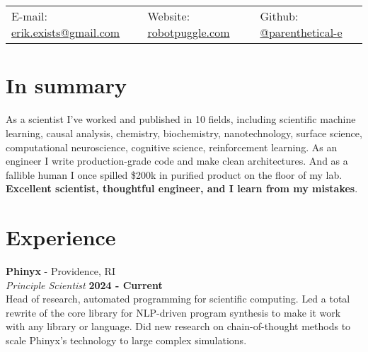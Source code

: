 \documentclass[margin,line]{res}
\begin{document}
\newcommand{\link}[1]{\texttt{#1}}
\providecommand{\tightlist}{%
    \setlength{\itemsep}{0pt}\setlength{\parskip}{0pt}}



\begin{resume}
\section{\sc }
\vspace{.05in}

\begin{tabular}{@{}p{2in}p{2in}p{2in}}
{E-mail:}  {\href{mailto:erik.exists@gmail.com}{erik.exists@gmail.com}} & {Website:} \href{http://robotpuggle.com}{robotpuggle.com} & {Github:} \href{https://github.com/parenthetical-e/}{@parenthetical-e} \\
\end{tabular}

\vspace{-.4cm}
\section{\sc In summary}
As a scientist I've worked and published in 10 fields, including scientific machine learning, causal analysis, chemistry,  biochemistry, nanotechnology, surface science, computational neuroscience, cognitive science, reinforcement learning. As an engineer I write production-grade code and make clean architectures. And as a fallible human I once spilled \$200k in purified product on the floor of my lab. \textbf{Excellent scientist, thoughtful engineer, and I learn from my mistakes}.



\vspace{-.35cm}
\section{\sc Experience}
{\bf Phinyx} - Providence, RI\\
{\em Principle Scientist} \hfill {\bf 2024 - Current}\\
Head of research, automated programming for scientific computing. Led a total rewrite of the core library for NLP-driven program synthesis to make it work with any library or language. Did new research on chain-of-thought methods to scale Phinyx's technology to large complex simulations. 


\end{resume}
\end{document}
